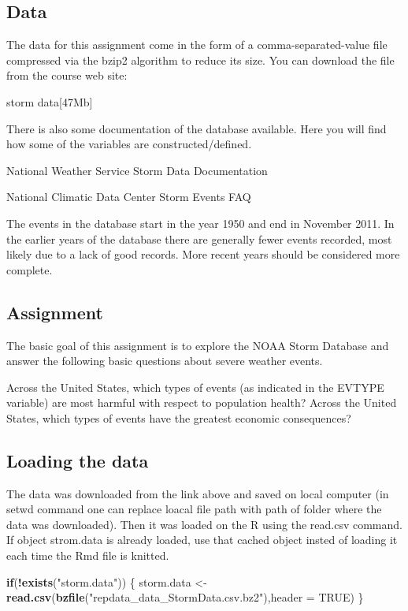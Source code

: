\documentclass[
]{article}
\newenvironment{Shaded}{\begin{snugshade}}{\end{snugshade}}
\newcommand{\ControlFlowTok}[1]{\textcolor[rgb]{0.13,0.29,0.53}{\textbf{#1}}}
\newcommand{\DataTypeTok}[1]{\textcolor[rgb]{0.13,0.29,0.53}{#1}}
\newcommand{\KeywordTok}[1]{\textcolor[rgb]{0.13,0.29,0.53}{\textbf{#1}}}
\newcommand{\NormalTok}[1]{#1}
\newcommand{\OperatorTok}[1]{\textcolor[rgb]{0.81,0.36,0.00}{\textbf{#1}}}
\newcommand{\OtherTok}[1]{\textcolor[rgb]{0.56,0.35,0.01}{#1}}
\newcommand{\StringTok}[1]{\textcolor[rgb]{0.31,0.60,0.02}{#1}}
\begin{document}
\hypertarget{data}{%
\subsection{Data}\label{data}}

The data for this assignment come in the form of a comma-separated-value
file compressed via the bzip2 algorithm to reduce its size. You can
download the file from the course web site:

storm data{[}47Mb{]}

There is also some documentation of the database available. Here you
will find how some of the variables are constructed/defined.

National Weather Service Storm Data Documentation

National Climatic Data Center Storm Events FAQ

The events in the database start in the year 1950 and end in November
2011. In the earlier years of the database there are generally fewer
events recorded, most likely due to a lack of good records. More recent
years should be considered more complete.

\hypertarget{assignment}{%
\subsection{Assignment}\label{assignment}}

The basic goal of this assignment is to explore the NOAA Storm Database
and answer the following basic questions about severe weather events.

Across the United States, which types of events (as indicated in the
EVTYPE variable) are most harmful with respect to population health?
Across the United States, which types of events have the greatest
economic consequences?

\hypertarget{loading-the-data}{%
\subsection{Loading the data}\label{loading-the-data}}

The data was downloaded from the link above and saved on local computer
(in setwd command one can replace loacal file path with path of folder
where the data was downloaded). Then it was loaded on the R using the
read.csv command. If object strom.data is already loaded, use that
cached object insted of loading it each time the Rmd file is knitted.

\begin{Shaded}
\begin{Highlighting}[]
\ControlFlowTok{if}\NormalTok{(}\OperatorTok{!}\KeywordTok{exists}\NormalTok{(}\StringTok{"storm.data"}\NormalTok{)) \{}
\NormalTok{    storm.data <-}\StringTok{ }\KeywordTok{read.csv}\NormalTok{(}\KeywordTok{bzfile}\NormalTok{(}\StringTok{"repdata_data_StormData.csv.bz2"}\NormalTok{),}\DataTypeTok{header =} \OtherTok{TRUE}\NormalTok{)}
\NormalTok{  \}}
\end{Highlighting}
\end{Shaded}
\end{document}
